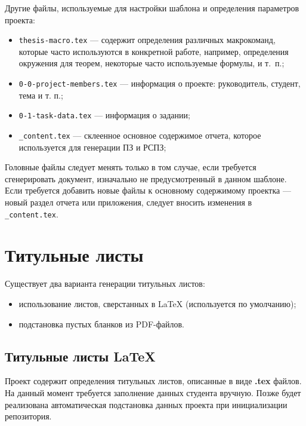 Другие файлы, используемые для настройки шаблона и определения параметров
проекта:

\begin{itemize}
  \item[] \texttt{thesis-macro.tex} --- содержит определения различных
  макрокоманд, которые часто используются в конкретной работе, например,
  определения окружения для теорем, некоторые часто используемые формулы, и
  т.~п.;
  \item[] \texttt{0-0-project-members.tex} --- информация о проекте:
  руководитель, студент, тема и т. п.;
  \item[] \texttt{0-1-task-data.tex} --- информация о задании;
  \item[] \texttt{\_content.tex} --- склеенное основное содержимое отчета,
  которое используется для генерации ПЗ и РСПЗ;
\end{itemize}


Головные файлы следует менять только в том случае, если требуется сгенерировать
документ, изначально не предусмотренный в данном шаблоне. Если требуется
добавить новые файлы к основному содержимому проектка — новый раздел отчета или
приложения, следует вносить изменения в \texttt{\_content.tex}.

\section{Титульные листы}

Существует два варианта генерации титульных листов:

\begin{itemize}
  \item использование листов, сверстанных в \LaTeX{} (используется по
  умолчанию);
  \item подстановка пустых бланков из PDF-файлов.
\end{itemize}

\subsection{Титульные листы LaTeX}

Проект содержит определения титульных листов, описанные в виде \textbf{.tex}
файлов. На данный момент требуется заполнение данных студента вручную. Позже
будет реализована автоматическая подстановка данных проекта при инициализации
репозитория.

